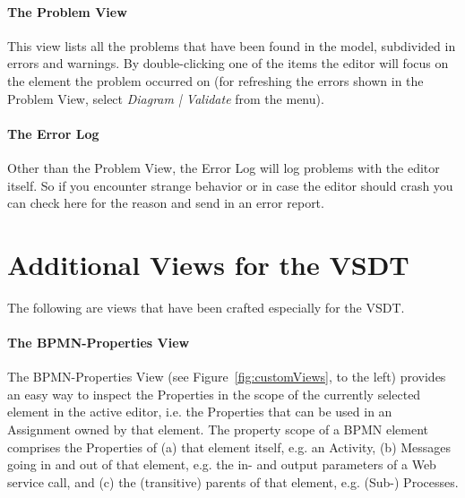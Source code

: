 \paragraph*{The Problem View}
This view lists all the problems that have been found in the model, subdivided in
errors and warnings.  By double-clicking one of the items the editor will focus
on the element the problem occurred on (for refreshing the errors shown in the
Problem View, select \emph{Diagram | Validate} from the menu).

\paragraph*{The Error Log}
Other than the Problem View, the Error Log will log problems with the editor
itself.  So if you encounter strange behavior or in case the editor should crash
you can check here for the reason and send in an error report.



\section{Additional Views for the VSDT}
\label{sec:user_perspective_vsdtviews}

The following are views that have been crafted especially for the VSDT.

\paragraph*{The BPMN-Properties View}

The BPMN-Properties View (see Figure~\ref{fig:customViews}, to the left) provides
an easy way to inspect the Properties in the scope of the currently selected
element in the active editor, i.e. the Properties that can be used in an Assignment
owned by that element.  The property scope of a BPMN element comprises the
Properties of (a) that element itself, e.g. an Activity, (b) Messages going in
and out of that element, e.g. the in- and output parameters of a Web service call,
and (c) the (transitive) parents of that element, e.g. (Sub-) Processes.

